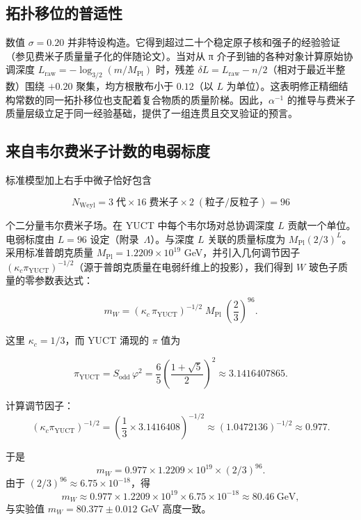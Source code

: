 \documentclass[12pt,a4paper]{article}
\theoremstyle{remark}
\begin{document}
	\subsection{拓扑移位的普适性}
	
	数值 \(\sigma = 0.20\) 并非特设构造。它得到超过二十个稳定原子核和强子的经验验证（参见费米子质量量子化的伴随论文）。当对从 π 介子到铀的各种对象计算原始协调深度 \(L_{\mathrm{raw}} = -\log_{3/2}(m/M_{\mathrm{Pl}})\) 时，残差 \(\delta L = L_{\mathrm{raw}} - n/2\)（相对于最近半整数）围绕 \(+0.20\) 聚集，均方根散布小于 \(0.12\)（以 \(L\) 为单位）。这表明修正精细结构常数的同一拓扑移位也支配着复合物质的质​​量阶梯。因此，\(\alpha^{-1}\) 的推导与费米子质量层级立足于同一经验基础，提供了一组连贯且交叉验证的预言。
	
	\subsection{来自韦尔费米子计数的电弱标度}
	
	标准模型加上右手中微子恰好包含
	
	\begin{equation}
		N_{\mathrm{Weyl}} = 3\;\text{代} \times 16\;\text{费米子}
		\times 2\;(\text{粒子/反粒子}) = 96
	\end{equation}
	
	个二分量韦尔费米子场。在 YUCT 中每个韦尔场对总协调深度 \(L\) 贡献一个单位。电弱标度由 \(L = 96\) 设定（附录~\(\Lambda\)）。与深度 \(L\) 关联的质量标度为 \(M_{\mathrm{Pl}} (2/3)^{L}\)。采用标准普朗克质量 \(M_{\mathrm{Pl}} = 1.2209 \times 10^{19}\) GeV，并引入几何调节因子 \((\kappa_c \pi_{\mathrm{YUCT}})^{-1/2}\)（源于普朗克质量在电弱纤维上的投影），我们得到 \(W\) 玻色子质量的零参数表达式：
	
	\begin{equation}
		\boxed{m_W = \left( \kappa_c \, \pi_{\mathrm{YUCT}} \right)^{-1/2}
			\; M_{\mathrm{Pl}} \; \left( \frac{2}{3} \right)^{96}}.
		\label{eq:mw-corrected}
	\end{equation}
	
	这里 \(\kappa_c = 1/3\)，而 YUCT 涌现的 \(\pi\) 值为
	
	\[
	\pi_{\mathrm{YUCT}} = S_{\mathrm{odd}} \, \varphi^2
	= \frac{6}{5} \left( \frac{1+\sqrt{5}}{2} \right)^2
	\approx 3.1416407865.
	\]
	
	计算调节因子：
	\[
	\left( \kappa_c \pi_{\mathrm{YUCT}} \right)^{-1/2}
	= \left( \frac{1}{3} \times 3.1416408 \right)^{-1/2}
	\approx (1.0472136)^{-1/2} \approx 0.977.
	\]
	
	于是
	\[
	m_W = 0.977 \times 1.2209 \times 10^{19} \times (2/3)^{96}.
	\]
	由于 \((2/3)^{96} \approx 6.75 \times 10^{-18}\)，得
	\[
	m_W \approx 0.977 \times 1.2209 \times 10^{19} \times 6.75 \times 10^{-18}
	\approx 80.46\ \text{GeV},
	\]
	与实验值 \(m_W = 80.377 \pm 0.012\) GeV 高度一致。
	
\end{document}
